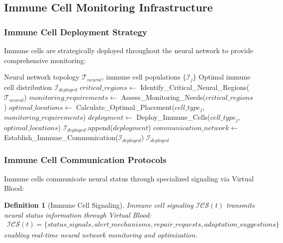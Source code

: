 \documentclass[12pt,a4paper]{article}
\newtheorem{definition}{Definition}
\begin{document}
\subsection{Immune Cell Monitoring Infrastructure}

\subsubsection{Immune Cell Deployment Strategy}

Immune cells are strategically deployed throughout the neural network to provide comprehensive monitoring:

\begin{algorithm}
\caption{Immune Cell Sensor Deployment}
\begin{algorithmic}[1]
\REQUIRE Neural network topology $\mathcal{T}_{neural}$, immune cell populations $\{\mathcal{I}_j\}$
\ENSURE Optimal immune cell distribution $\mathcal{I}_{deployed}$
\STATE $critical\_regions \leftarrow$ Identify\_Critical\_Neural\_Regions($\mathcal{T}_{neural}$)
\STATE $monitoring\_requirements \leftarrow$ Assess\_Monitoring\_Needs($critical\_regions$)
    \STATE $optimal\_locations \leftarrow$ Calculate\_Optimal\_Placement($cell\_type_j$, $monitoring\_requirements$)
    \STATE $deployment \leftarrow$ Deploy\_Immune\_Cells($cell\_type_j$, $optimal\_locations$)
    \STATE $\mathcal{I}_{deployed}$.append($deployment$)
\ENDFOR
\STATE $communication\_network \leftarrow$ Establish\_Immune\_Communication($\mathcal{I}_{deployed}$)
\RETURN $\mathcal{I}_{deployed}$
\end{algorithmic}
\end{algorithm}

\subsubsection{Immune Cell Communication Protocols}

Immune cells communicate neural status through specialized signaling via Virtual Blood:

\begin{definition}[Immune Cell Signaling]
Immune cell signaling $\mathcal{ICS}(t)$ transmits neural status information through Virtual Blood:
\begin{align}
\mathcal{ICS}(t) = \{status\_signals, alert\_mechanisms, repair\_requests, adaptation\_suggestions\}
\end{align}
enabling real-time neural network monitoring and optimization.
\end{definition}
\end{document}
